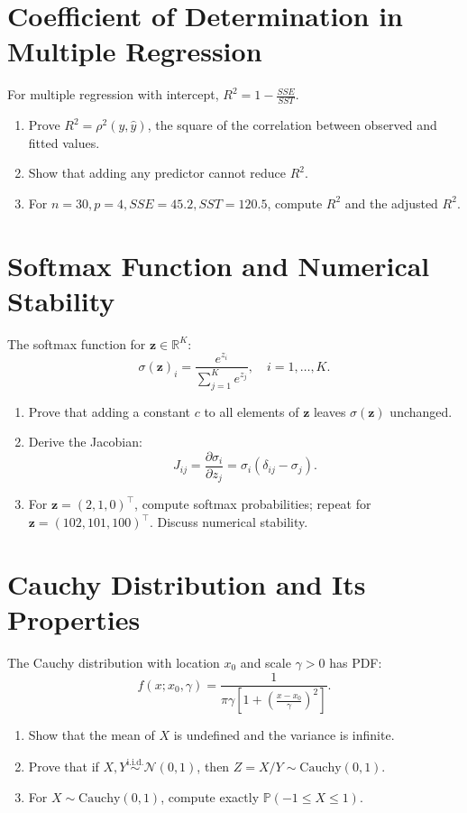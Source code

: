 \documentclass[12pt,a4paper]{article}
\begin{document}
\section{Coefficient of Determination in Multiple Regression}
For multiple regression with intercept, \( R^2 = 1 - \frac{SSE}{SST} \).
\begin{enumerate}[label=(\arabic*)]
\item Prove \( R^2 = \rho^2(y,\hat{y}) \), the square of the correlation between observed and fitted values.
\item Show that adding any predictor cannot reduce \( R^2 \).
\item For \( n=30,p=4,SSE=45.2,SST=120.5 \), compute \( R^2 \) and the adjusted \( R^2 \).
\end{enumerate}

\section{Softmax Function and Numerical Stability}
The softmax function for \( \mathbf{z}\in\mathbb{R}^K \):
\[
\sigma(\mathbf{z})_i = \frac{e^{z_i}}{\sum_{j=1}^K e^{z_j}}, \quad i=1,\ldots,K.
\]
\begin{enumerate}[label=(\arabic*)]
\item Prove that adding a constant \( c \) to all elements of \( \mathbf{z} \) leaves \( \sigma(\mathbf{z}) \) unchanged.
\item Derive the Jacobian:
\[
J_{ij} = \frac{\partial \sigma_i}{\partial z_j} =
\sigma_i(\delta_{ij} - \sigma_j).
\]
\item For \( \mathbf{z}=(2,1,0)^\top \), compute softmax probabilities; repeat for \( \mathbf{z}=(102,101,100)^\top \).
Discuss numerical stability.
\end{enumerate}


\section{Cauchy Distribution and Its Properties}
The Cauchy distribution with location \( x_0 \) and scale \( \gamma > 0 \) has PDF:
\[
f(x;x_0,\gamma) = \frac{1}{\pi\gamma\left[1+\left(\frac{x-x_0}{\gamma}\right)^2\right]}.
\]
\begin{enumerate}[label=(\arabic*)]
\item Show that the mean of \( X \) is undefined and the variance is infinite.
\item Prove that if \( X,Y \stackrel{\text{i.i.d.}}{\sim} \mathcal{N}(0,1) \), then \( Z = X/Y \sim \mathrm{Cauchy}(0,1) \).
\item For \( X \sim \mathrm{Cauchy}(0,1) \), compute exactly \( \mathbb{P}(-1 \le X \le 1) \).
\end{enumerate}
\end{document}
